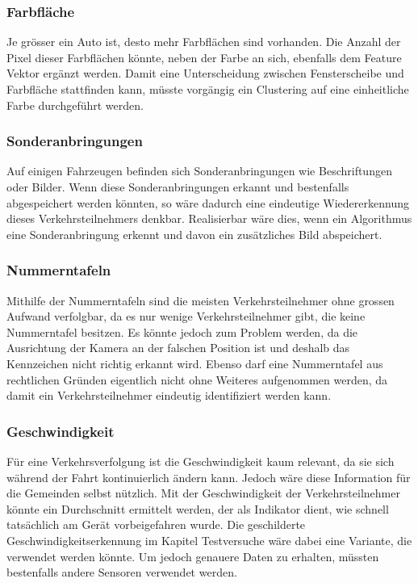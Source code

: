 \subsubsection{Farbfläche}
Je grösser ein Auto ist, desto mehr Farbflächen sind vorhanden. Die Anzahl der Pixel dieser Farbflächen könnte, neben der Farbe an sich, ebenfalls dem Feature Vektor ergänzt werden. Damit eine Unterscheidung zwischen Fensterscheibe und Farbfläche stattfinden kann, müsste vorgängig ein Clustering auf eine einheitliche Farbe durchgeführt werden.

\subsubsection{Sonderanbringungen}
Auf einigen Fahrzeugen befinden sich Sonderanbringungen wie Beschriftungen oder Bilder. Wenn diese Sonderanbringungen erkannt und bestenfalls abgespeichert werden könnten, so wäre dadurch eine eindeutige Wiedererkennung dieses Verkehrsteilnehmers denkbar. Realisierbar wäre dies, wenn ein Algorithmus eine Sonderanbringung erkennt und davon ein zusätzliches Bild abspeichert.

\subsubsection{Nummerntafeln}
Mithilfe der Nummerntafeln sind die meisten Verkehrsteilnehmer ohne grossen Aufwand verfolgbar, da es nur wenige Verkehrsteilnehmer gibt, die keine Nummerntafel besitzen. Es könnte jedoch zum Problem werden, da die Ausrichtung der Kamera an der falschen Position ist und deshalb das Kennzeichen nicht richtig erkannt wird. Ebenso darf eine Nummerntafel aus rechtlichen Gründen eigentlich nicht ohne Weiteres aufgenommen werden, da damit ein Verkehrsteilnehmer eindeutig identifiziert werden kann.

\subsubsection{Geschwindigkeit}
Für eine Verkehrsverfolgung ist die Geschwindigkeit kaum relevant, da sie sich während der Fahrt kontinuierlich ändern kann. Jedoch wäre diese Information für die Gemeinden selbst nützlich. Mit der Geschwindigkeit der Verkehrsteilnehmer könnte ein Durchschnitt ermittelt werden, der als Indikator dient, wie schnell tatsächlich am Gerät vorbeigefahren wurde. Die geschilderte Geschwindigkeitserkennung im Kapitel Testversuche wäre dabei eine Variante, die verwendet werden könnte. Um jedoch genauere Daten zu erhalten, müssten bestenfalls andere Sensoren verwendet werden.